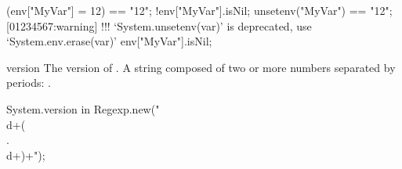 \begin{urbiscriptapi}
\begin{urbiassert}
(env["MyVar"] = 12) == "12";
!env["MyVar"].isNil;
unsetenv("MyVar") == "12";
[01234567:warning] !!! `System.unsetenv(var)' is deprecated, use `System.env.erase(var)'
env["MyVar"].isNil;
\end{urbiassert}


\item[version]%
  The version of \usdk.  A string composed of two or more numbers separated
  by periods: .
\begin{urbiassert}
System.version in Regexp.new("\\d+(\\.\\d+)+");
\end{urbiassert}
\end{urbiscriptapi}

